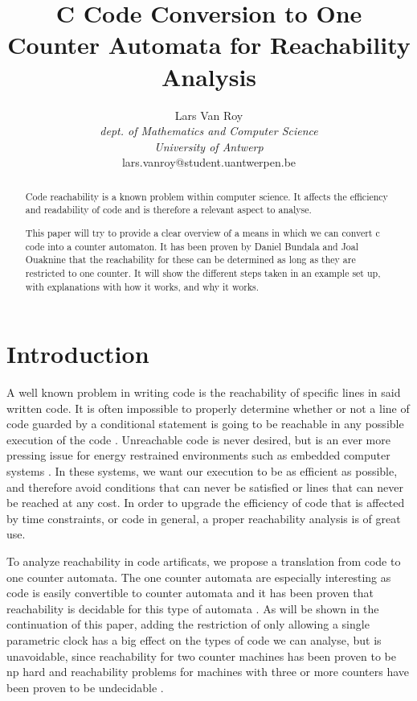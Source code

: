 \documentclass[12pt]{article}
\title{C Code Conversion to One Counter Automata for Reachability Analysis}
\author{Lars Van Roy\\
\textit{dept. of Mathematics and Computer Science} \\
\textit{University of Antwerp}\\
lars.vanroy@student.uantwerpen.be}
\begin{document}
\maketitle{}

\begin{abstract}
\noindent
\noindent
Code reachability is a known problem within computer science. It affects the efficiency and readability of code and is therefore a relevant aspect to analyse.

\noindent
This paper will try to provide a clear overview of a means in which we can convert c code into a counter automaton. It has been proven by Daniel Bundala and Joal Ouaknine that the reachability for these can be determined as long as they are restricted to one counter. It will show the different steps taken in an example set up, with explanations with how it works, and why it works.
\end{abstract}

\section{Introduction}
A well known problem in writing code is the reachability of specific lines in said written code. It is often impossible to properly determine whether or not a line of code guarded by a conditional statement is going to be reachable in any possible execution of the code \cite{713323, 10.1145/1292316.1292319}. Unreachable code is never desired, but is an ever more pressing issue for energy restrained environments such as embedded computer systems \cite{embeddedefficiency}. In these systems, we want our execution to be as efficient as possible, and therefore avoid conditions that can never be satisfied or lines that can never be reached at any cost. In order to upgrade the efficiency of code that is affected by time constraints, or code in general, a proper reachability analysis is of great use.

To analyze reachability in code artificats, we propose a translation from code to one counter automata. The one counter automata are especially interesting as code is easily convertible to counter automata and it has been proven that reachability is decidable for this type of automata \cite{succintandparametriconecounter, danialandjoel}. As will be shown in the continuation of this paper, adding the restriction of only allowing a single parametric clock has a big effect on the types of code we can analyse, but is unavoidable, since reachability for two counter machines has been proven to be np hard and reachability problems for machines with three or more counters have been proven to be undecidable \cite{FEARNLEY201526}.
\end{document}
